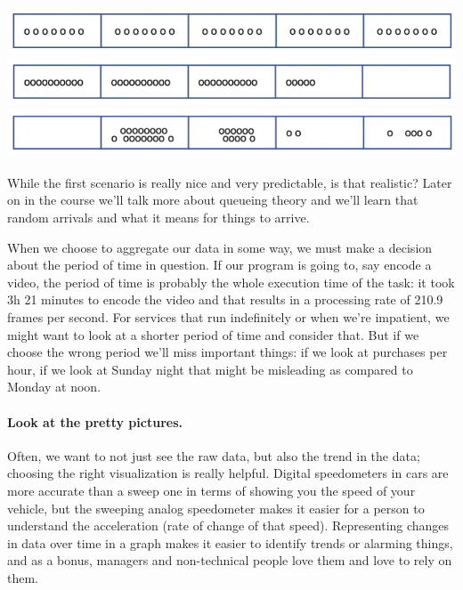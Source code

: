 \documentclass[a4paper]{report}
\begin{document}
\begin{center}
	\includegraphics{images/burst1}\\
	\includegraphics{images/burst2}\\
	\includegraphics{images/burst3}\\
\end{center}

While the first scenario is really nice and very predictable, is that realistic? Later on in the course we'll talk more about queueing theory and we'll learn that random arrivals and what it means for things to arrive.

When we choose to aggregate our data in some way, we must make a decision about the period of time in question. If our program is going to, say encode a video, the period of time is probably the whole execution time of the task: it took 3h 21 minutes to encode the video and that results in a processing rate of 210.9 frames per second. For services that run indefinitely or when we're impatient, we might want to look at a shorter period of time and consider that. But if we choose the wrong period we'll miss important things: if we look at purchases per hour, if we look at Sunday night that might be misleading as compared to Monday at noon.

\paragraph{Look at the pretty pictures.} 
Often, we want to not just see the raw data, but also the trend in the data; choosing the right visualization is really helpful. Digital speedometers in cars are more accurate than a sweep one in terms of showing you the speed of your vehicle, but the sweeping analog speedometer makes it easier for a person to understand the acceleration (rate of change of that speed). Representing changes in data over time in a graph makes it easier to identify trends or alarming things, and as a bonus, managers and non-technical people love them and love to rely on them. 
\end{document}
